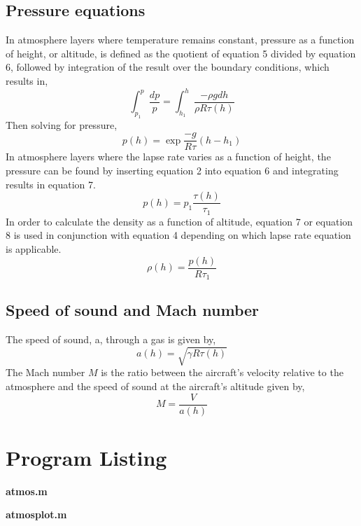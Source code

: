 \documentclass[12pt]{report}
\begin{document}
\subsection{Pressure equations}
In atmosphere layers where temperature remains constant, pressure as a function of height, or altitude, is defined as the quotient of equation 5 divided by equation 6, followed by integration of the result over the boundary conditions, which results in,
\begin{equation}
	\int^p_{p_{1}}{\frac{dp}{p}} = \int^h_{h_{1}}{\frac{-\rho gdh}{\rho R \tau (h)}}
	\label{equation:intpressure}
\end{equation}
Then solving for pressure,
\begin{equation}
	p(h) = \exp{\frac{-g}{R\tau}(h-h_{1})}
	\label{equation:pressureh}
\end{equation}
In atmosphere layers where the lapse rate varies as a function of height, the pressure can be found by inserting equation 2 into equation 6 and integrating results in equation 7.
\begin{equation}
	p(h) = p_{1}\frac{\tau (h)}{\tau_1}
	\label{equation:pressureh2}
\end{equation}
In order to calculate the density as a function of altitude, equation 7 or equation 8 is used in conjunction with equation 4 depending on which lapse rate equation is applicable.
\begin{equation}
	\rho(h) = \frac{p(h)}{R\tau_1}
	\label{equation:equation8}
\end{equation}
\subsection{Speed of sound and Mach number}
The speed of sound, a, through a gas is given by,
\begin{equation}
	a(h) = \sqrt{\gamma R \tau (h)}
	\label{equation:equation9}
\end{equation}
The Mach number \(M\) is the ratio between the aircraft's velocity relative to the atmosphere and the speed of sound at the aircraft's altitude given by,
\begin{equation}
	M = \frac{V}{a(h)}
	\label{equation:equation6}
\end{equation}




\section{Program Listing}
\textbf{atmos.m}

\textbf{atmosplot.m}

\end{document}
